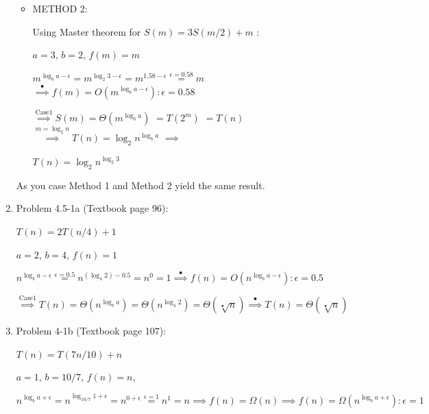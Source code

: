 \documentclass[11pt]{article}
\begin{document}
\begin{enumerate}
\begin{itemize}
    \end{itemize}	
	

	\begin{itemize}
	    \item METHOD 2:
	    
	    Using Master theorem for $ S(m) = 3S(m/2) + m$ :
	    
    	$a=3$, $b=2$, $f(m)=m$
    	
    	$m^{\log_b{a}-\epsilon} \overset{}{=} m^{\log_{2}{3}-\epsilon}=m^{1.58-\epsilon}\overset{\epsilon=0.58}{=}m$  
	    $\overset{\mathrm{•}}{\implies} f(m)=O(m^{\log_b{a}-\epsilon}):\epsilon=0.58$
	    
	    $\overset{\mathrm{Case 1}}{\implies} S(m)=\Theta(m^{\log_b{a}})$	
	    $\overset{\mathrm{}}{=}T(2^m)$
	    $\overset{\mathrm{}}{=}T(n)$
	    $\overset{m=\log_2{n}}{\implies}T(n)=\log_2{n}^{\log_b{a}}$	
	    $\overset{}{\implies}$
	    
	    $T(n)=\log_2{n}^{\log_2{3}}$	
  		 

    \end{itemize}
    
    As you case Method 1 and Method 2 yield the same result.
	
	
	
	

	
	
	 
\pagebreak
	
\item Problem 4.5-1a (Textbook page 96):
	
	$T(n)=2T(n/4)+1$
	
	$a=2$, $b=4$, $f(n)=1$
	
	$n^{\log_b{a}-\epsilon} \overset{\epsilon=0.5}{=} n^{(\log_4{2})-0.5}=n^{0}=1
	\overset{\mathrm{•}}{\implies} f(n)=O(n^{\log_b{a}-\epsilon}):\epsilon=0.5$
	
	$\overset{\mathrm{Case 1}}{\implies} T(n)=\Theta(n^{\log_b{a}})=\Theta(n^{\log_4{2}})=\Theta(\sqrt[•]{n}) 
	\overset{\mathrm{•}}{\implies} T(n)=\Theta(\sqrt[•]{n}) $ 







\item Problem 4-1b (Textbook page 107):

	$T(n)=T(7n/10)+n$

	$a=1$, $b=10/7$, $f(n)=n$, 
	
	$n^{\log_b{a}+\epsilon} \overset{}{=} n^{\log_{10/7}{1}+\epsilon}=n^{0+\epsilon}\overset{\epsilon = 1}{=}n^{1}=n  
	\overset{}{\implies} f(n)=\Omega(n)
	\overset{}{\implies} f(n)=\Omega(n^{\log_b{a}+\epsilon}):\epsilon=1$
	

\end{enumerate}
\end{document}
